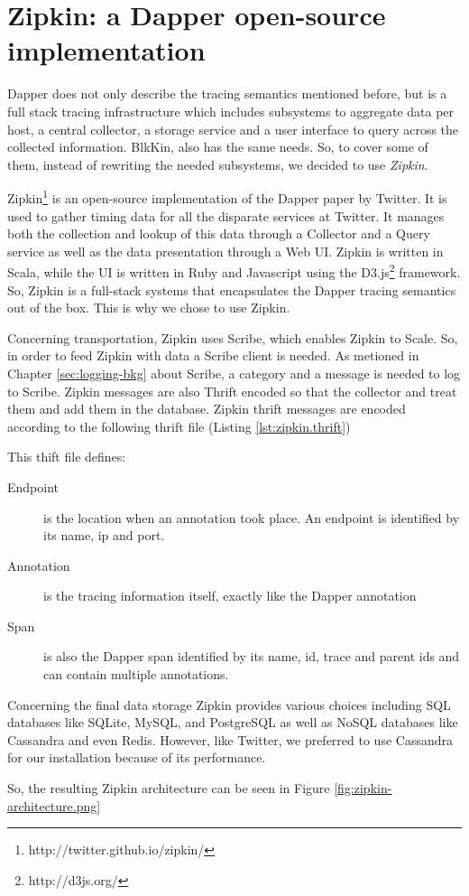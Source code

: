 \section{Zipkin: a Dapper open-source implementation}\label{sec:zipkin}

Dapper does not only describe the tracing semantics mentioned before, but is a
full stack tracing infrastructure which includes subsystems to aggregate data
per host, a central collector, a storage service and a user interface to query
across the collected information. BlkKin, also has the same needs. So, to cover
some of them, instead of rewriting the needed subsystems, we decided to use
\textit{Zipkin}.


Zipkin\footnote{http://twitter.github.io/zipkin/} is an open-source
implementation of the Dapper paper by Twitter. It is used to gather timing data
for all the disparate services at Twitter. It manages both the collection and
lookup of this data through a Collector and a Query service as well as the data
presentation through a Web UI. Zipkin is written in Scala, while the UI is
written in Ruby and Javascript using the D3.js\footnote{http://d3js.org/}
framework. So, Zipkin is a full-stack systems that encapsulates the Dapper
tracing semantics out of the box. This is why we chose to use Zipkin.

Concerning transportation, Zipkin uses Scribe, which enables Zipkin to Scale.
So, in order to feed Zipkin with data a Scribe client is needed. As metioned in
Chapter \ref{sec:logging-bkg} about Scribe, a category and a message is needed
to log to Scribe. Zipkin messages are also Thrift encoded so that the collector
and treat them and add them in the database. Zipkin thrift messages are encoded
according to the following thrift file (Listing \ref{lst:zipkin.thrift}) 

This thift file defines:

\begin{description}
\item[Endpoint] is the location when an annotation took place. An endpoint is
identified by its name, ip and port.
\item[Annotation] is the tracing information itself, exactly like the Dapper
annotation
\item[Span] is also the Dapper span identified by its name, id, trace and parent
ids and can contain multiple annotations.
\end{description} 


Concerning the final data storage Zipkin provides various choices including SQL
databases like SQLite, MySQL, and PostgreSQL as well as NoSQL databases like
Cassandra and even Redis. However, like Twitter, we preferred to use Cassandra
for our installation because of its performance.

So, the resulting Zipkin architecture can be seen in Figure
\ref{fig:zipkin-architecture.png}
